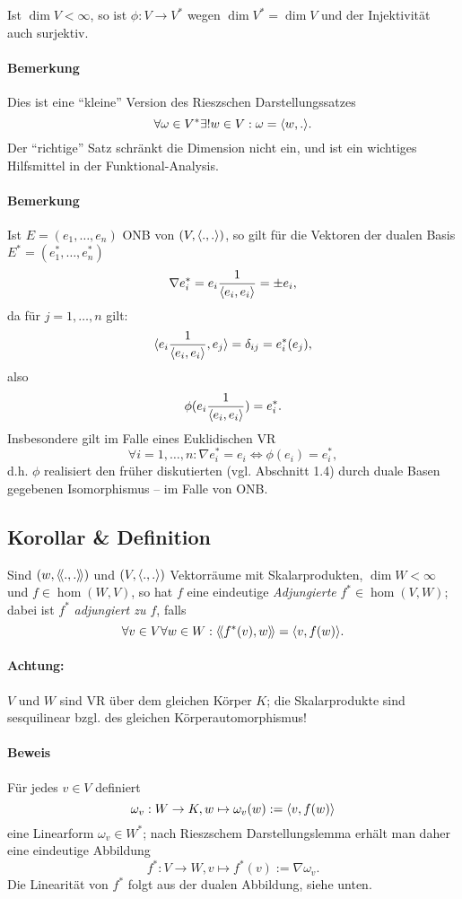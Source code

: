 	Ist $ \dim V <\infty $, so ist $ \phi:V\to V^* $ wegen $ \dim V^* = \dim V $ und der Injektivität auch surjektiv.
\paragraph{Bemerkung}
	Dies ist eine "`kleine"' Version des Rieszschen Darstellungssatzes
	\[ \forall \omega\in V^*\exists! w\in V: \omega = \langle w,. \rangle. \]
	Der "`richtige"' Satz schränkt die Dimension nicht ein, und ist ein wichtiges Hilfsmittel in der Funktional-Analysis.
\paragraph{Bemerkung}
	Ist $ E = (e_1,\dots,e_n) $ ONB von $ (V,\langle .,. \rangle) $, so gilt für die Vektoren der dualen Basis $ E^* = (e_1^*,\dots,e_n^*) $
		\[ \nabla e_i^* = e_i\frac{1}{\langle e_i,e_i \rangle} = \pm e_i, \]
	da für $ j=1,\dots,n $ gilt:
		\[ \langle e_i\frac{1}{\langle e_i,e_i \rangle},e_j \rangle = \delta_{ij} = e_i^*(e_j), \]
	also
		\[ \phi(e_i\frac{1}{\langle e_i,e_i \rangle}) = e_i^*. \]
	Insbesondere gilt im Falle eines Euklidischen VR
		\[ \forall i=1,\dots,n: \nabla e_i^* = e_i \Leftrightarrow \phi(e_i)= e_i^*, \]
	d.h. $ \phi $ realisiert den früher diskutierten (vgl. Abschnitt 1.4) durch duale Basen gegebenen
	Isomorphismus -- im Falle von ONB.

\subsection{Korollar \& Definition}
\begin{Definition}[Adjungierte]
	Sind $ (w,\langle\! \langle .,. \rangle\! \rangle) $ und $ (V,\langle .,. \rangle) $ Vektorräume mit Skalarprodukten, $ \dim W < \infty $ und $ f\in \hom(W,V) $, so hat $ f $ eine eindeutige \emph{Adjungierte} $ f^* \in \hom(V,W) $;
	dabei ist $ f^* $ \emph{adjungiert zu $ f $}, falls
		\[ \forall v\in V\forall w\in W: \langle\! \langle f^*(v),w \rangle\! \rangle = \langle v,f(w) \rangle. \]
\end{Definition}
\paragraph{Achtung:}
$ V $ und $ W $ sind VR über dem gleichen Körper $ K $; die Skalarprodukte sind sesquilinear bzgl. des gleichen Körperautomorphismus!
\paragraph{Beweis}
	Für jedes $ v\in V $ definiert
		\[ \omega_v:W\to K, w\mapsto \omega_v(w) := \langle v,f(w) \rangle \]
	eine Linearform $ \omega_v\in W^* $; nach Rieszschem Darstellungslemma erhält man daher eine eindeutige Abbildung 
		\[ f^*:V\to W, v\mapsto f^*(v):= \nabla \omega_v. \]
	Die Linearität von $ f^* $ folgt aus der dualen Abbildung, siehe unten.
